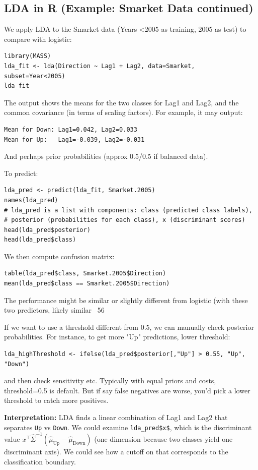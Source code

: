 \documentclass[11pt]{article}
\begin{document}
\subsection{LDA in R (Example: Smarket Data continued)}
We apply LDA to the Smarket data (Years <2005 as training, 2005 as test) to compare with logistic:
\begin{verbatim}
library(MASS)
lda_fit <- lda(Direction ~ Lag1 + Lag2, data=Smarket, subset=Year<2005)
lda_fit
\end{verbatim}
The output shows the means for the two classes for Lag1 and Lag2, and the common covariance (in terms of scaling factors). For example, it may output:
\begin{verbatim}
Mean for Down: Lag1=0.042, Lag2=0.033
Mean for Up:   Lag1=-0.039, Lag2=-0.031
\end{verbatim}
And perhaps prior probabilities (approx 0.5/0.5 if balanced data).

To predict:
\begin{verbatim}
lda_pred <- predict(lda_fit, Smarket.2005)
names(lda_pred)
# lda_pred is a list with components: class (predicted class labels),
# posterior (probabilities for each class), x (discriminant scores)
head(lda_pred$posterior)
head(lda_pred$class)
\end{verbatim}
We then compute confusion matrix:
\begin{verbatim}
table(lda_pred$class, Smarket.2005$Direction)
mean(lda_pred$class == Smarket.2005$Direction)
\end{verbatim}
The performance might be similar or slightly different from logistic (with these two predictors, likely similar ~56%

If we want to use a threshold different from 0.5, we can manually check posterior probabilities. For instance, to get more "Up" predictions, lower threshold:
\begin{verbatim}
lda_highThreshold <- ifelse(lda_pred$posterior[,"Up"] > 0.55, "Up", "Down")
\end{verbatim}
and then check sensitivity etc. Typically with equal priors and costs, threshold=0.5 is default. But if say false negatives are worse, you'd pick a lower threshold to catch more positives.

\textbf{Interpretation:} LDA finds a linear combination of Lag1 and Lag2 that separates \texttt{Up} vs \texttt{Down}. We could examine \texttt{lda\_pred\$x\$}, which is the discriminant value $x^\top \hat{\Sigma}^{-1}(\hat{\mu}_{\text{Up}} - \hat{\mu}_{\text{Down}})$ (one dimension because two classes yield one discriminant axis). We could see how a cutoff on that corresponds to the classification boundary.
\end{document}
